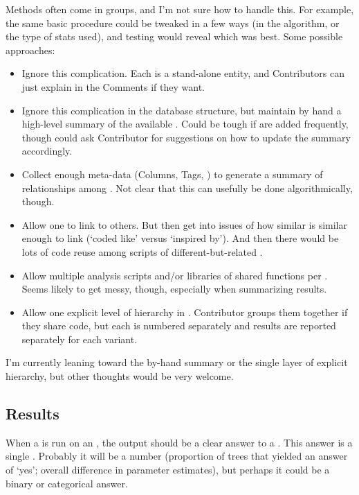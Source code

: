 Methods often come in groups, and I'm not sure how to handle this.
For example, the same basic procedure could be tweaked in a few ways (in the algorithm, or the type of stats used), and testing would reveal which was best.
Some possible approaches:
\begin{itemize}
    \item Ignore this complication.
          Each \Method is a stand-alone entity, and Contributors can just explain in the Comments if they want.
    \item Ignore this complication in the database structure, but maintain by hand a high-level summary of the available \Methods.
          Could be tough if \Methods are added frequently, though could ask Contributor for suggestions on how to update the summary accordingly.
    \item Collect enough meta-data (Columns, Tags, \etc) to generate a summary of relationships among \Methods.
          Not clear that this can usefully be done algorithmically, though.
    \item Allow one \Method to link to others.
          But then get into issues of how similar is similar enough to link (\eg `coded like' versus `inspired by').
          And then there would be lots of code reuse among scripts of different-but-related \Methods.
    \item Allow multiple analysis scripts and/or libraries of shared functions per \Method.
          Seems likely to get messy, though, especially when summarizing results.
    \item Allow one explicit level of hierarchy in \Methods.
          Contributor groups them together if they share code, but each is numbered separately and results are reported separately for each variant.
\end{itemize}

I'm currently leaning toward the by-hand summary or the single layer of explicit hierarchy, but other thoughts would be very welcome.

\subsection{Results}
\label{sec:tables_result}

When a \Method is run on an \Element, the output should be a clear answer to a \Task.
This answer is a single \Result.
Probably it will be a number (\eg proportion of trees that yielded an answer of `yes'; overall difference in parameter estimates), but perhaps it could be a binary or categorical answer.

